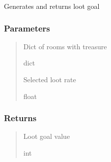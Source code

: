 \documentclass[letterpaper,10pt,english]{sphinxmanual}
\begin{document}

\begin{fulllineitems}
\label{\detokenize{api_reference/dungeon_resolver/generate_dungeon_problem:generate_dungeon_problem.generate_loot_goal}}
\pysigstartsignatures
{}
\pysigstopsignatures
\sphinxAtStartPar
Generates and returns loot goal


\subsubsection{Parameters}
\label{\detokenize{api_reference/dungeon_resolver/generate_dungeon_problem:id7}}\begin{quote}\begin{description}
\sphinxAtStartPar
Dict of rooms with treasure

\sphinxAtStartPar
dict

\sphinxAtStartPar
Selected loot rate

\sphinxAtStartPar
float

\end{description}\end{quote}


\subsubsection{Returns}
\label{\detokenize{api_reference/dungeon_resolver/generate_dungeon_problem:id8}}\begin{quote}\begin{description}
\sphinxAtStartPar
Loot goal value

\sphinxAtStartPar
int

\end{description}\end{quote}

\end{fulllineitems}

\end{document}
